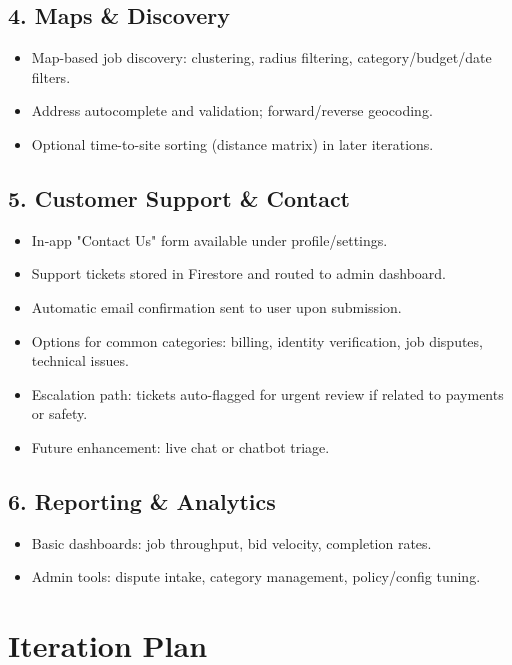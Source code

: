 \documentclass[11pt]{article}
\begin{document}
\subsection*{4. Maps \& Discovery}
\begin{itemize}[leftmargin=1.4em]
  \item Map-based job discovery: clustering, radius filtering, category/budget/date filters.
  \item Address autocomplete and validation; forward/reverse geocoding.
  \item Optional time-to-site sorting (distance matrix) in later iterations.
\end{itemize}

\subsection*{5. Customer Support \& Contact}
\begin{itemize}[leftmargin=1.4em]
  \item In-app "Contact Us" form available under profile/settings.
  \item Support tickets stored in Firestore and routed to admin dashboard.
  \item Automatic email confirmation sent to user upon submission.
  \item Options for common categories: billing, identity verification, job disputes, technical issues.
  \item Escalation path: tickets auto-flagged for urgent review if related to payments or safety.
  \item Future enhancement: live chat or chatbot triage.
\end{itemize}

\subsection*{6. Reporting \& Analytics}
\begin{itemize}[leftmargin=1.4em]
  \item Basic dashboards: job throughput, bid velocity, completion rates.
  \item Admin tools: dispute intake, category management, policy/config tuning.
\end{itemize}

\newpage

\section{Iteration Plan}
\end{document}

